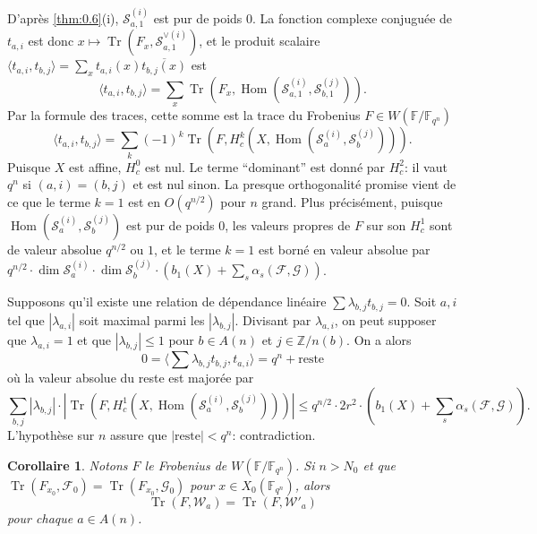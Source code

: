 \documentclass[11pt,a4paper]{article}
\theoremstyle{plain}
\newtheorem{corollary}[theorem]{Corollaire}
\theoremstyle{definition}
\DeclareMathOperator{\Hom}{Hom}
\DeclareMathOperator{\tr}{Tr}
\begin{document}
D'apr\`es \ref{thm:0.6}(i), $\mathcal{S}_{a,1}^{(i)}$ est pur de poids $0$. La fonction complexe conjugu\'ee de $t_{a,i}$ est donc $x \mapsto \tr(F_x, \mathcal{S}_{a,1}^{\vee(i)})$, et le produit scalaire $\langle t_{a,i}, t_{b,j} \rangle = \sum_x t_{a,i}(x) \overline{t_{b,j}(x)}$ est
\[
\langle t_{a,i}, t_{b,j} \rangle = \sum_x \tr(F_x, \Hom(\mathcal{S}_{a,1}^{(i)}, \mathcal{S}_{b,1}^{(j)})).
\]
Par la formule des traces, cette somme est la trace du Frobenius $F \in W(\mathbb{F}/\mathbb{F}_{q^n})$
\begin{equation}\label{eq:2.6.1}
\langle t_{a,i}, t_{b,j} \rangle = \sum_k (-1)^k \tr(F, H_c^k(X, \Hom(\mathcal{S}_a^{(i)}, \mathcal{S}_b^{(j)}))).
\end{equation}
Puisque $X$ est affine, $H_c^0$ est nul. Le terme ``dominant'' est donn\'e par $H_c^2$: il vaut $q^n$ si $(a,i) = (b,j)$ et est nul sinon. La presque orthogonalit\'e promise vient de ce que le terme $k=1$ est en $O(q^{n/2})$ pour $n$ grand. Plus pr\'ecis\'ement, puisque $\Hom(\mathcal{S}_a^{(i)}, \mathcal{S}_b^{(j)})$ est pur de poids $0$, les valeurs propres de $F$ sur son $H_c^1$ sont de valeur absolue $q^{n/2}$ ou $1$, et le terme $k=1$ est born\'e en valeur absolue par $q^{n/2} \cdot \dim \mathcal{S}_a^{(i)} \cdot \dim \mathcal{S}_b^{(j)} \cdot (b_1(X) + \sum_s \alpha_s(\mathcal{F}, \mathcal{G}))$.

Supposons qu'il existe une relation de d\'ependance lin\'eaire $\sum \lambda_{b,j} t_{b,j} = 0$. Soit $a,i$ tel que $|\lambda_{a,i}|$ soit maximal parmi les $|\lambda_{b,j}|$. Divisant par $\lambda_{a,i}$, on peut supposer que $\lambda_{a,i} = 1$ et que $|\lambda_{b,j}| \leq 1$ pour $b \in A(n)$ et $j \in \mathbb{Z}/n(b)$. On a alors
\[
0 = \langle \sum \lambda_{b,j} t_{b,j}, t_{a,i} \rangle = q^n + \text{reste}
\]
o\`u la valeur absolue du reste est major\'ee par
\[
\sum_{b,j} |\lambda_{b,j}| \cdot |\tr(F, H_c^1(X, \Hom(\mathcal{S}_a^{(i)}, \mathcal{S}_b^{(j)})))| \leq q^{n/2} \cdot 2r^2 \cdot (b_1(X) + \sum_s \alpha_s(\mathcal{F}, \mathcal{G})).
\]
L'hypoth\`ese sur $n$ assure que $|\text{reste}| < q^n$: contradiction.

\begin{corollary}\label{cor:2.7}
Notons $F$ le Frobenius de $W(\mathbb{F}/\mathbb{F}_{q^n})$. Si $n > N_0$ et que $\tr(F_{x_0}, \mathcal{F}_0) = \tr(F_{x_0}, \mathcal{G}_0)$ pour $x \in X_0(\mathbb{F}_{q^n})$, alors
\[
\tr(F, \mathcal{W}_a) = \tr(F, \mathcal{W}'_a)
\]
pour chaque $a \in A(n)$.
\end{corollary}
\end{document}

